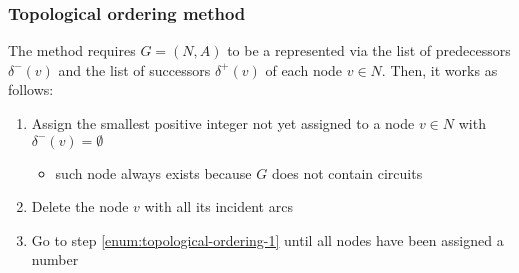 \documentclass[english]{article}
\begin{document}
\subsubsection{Topological ordering method}

The method requires \(G = (N, A)\) to be a \DAG represented via the list of predecessors \(\delta^-(v)\) and the list of successors \(\delta^+(v)\) of each node \(v \in N\).
Then, it works as follows:

\begin{enumerate}[label=\arabic*., ref=(\arabic*)]
  \item\label{enum:topological-ordering-1} Assign the smallest positive integer not yet assigned to a node \(v \in N \) with \(\delta^-(v) = \emptyset\)
  \begin{itemize}[label=\(\rightarrow\)]
    \item such node always exists because \(G\) does not contain circuits
  \end{itemize}
  \item Delete the node \(v\) with all its incident arcs
  \item Go to step  \ref{enum:topological-ordering-1} until all nodes have been assigned a number
\end{enumerate}
\end{document}
